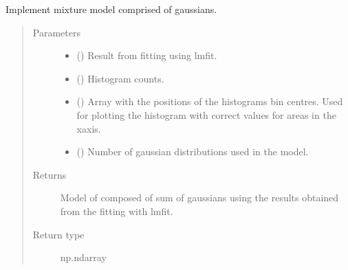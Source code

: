 \documentclass[letterpaper,10pt,english]{sphinxmanual}
\begin{document}
\begin{fulllineitems}
\label{\detokenize{tes:tes.calibration.gaussian_model}}
\sphinxAtStartPar
Implement mixture model comprised of gaussians.
\begin{quote}\begin{description}
\item[{Parameters}] \leavevmode\begin{itemize}
\item {} 
\sphinxAtStartPar
{} () \textendash{} Result from fitting using lmfit.

\item {} 
\sphinxAtStartPar
{} () \textendash{} Histogram counts.

\item {} 
\sphinxAtStartPar
{} () \textendash{} Array with the positions of the histograms bin centres.
Used for plotting the histogram with correct values
for areas in the x\sphinxhyphen{}axis.

\item {} 
\sphinxAtStartPar
{} () \textendash{} Number of gaussian distributions used in the model.

\end{itemize}

\item[{Returns}] \leavevmode
\sphinxAtStartPar
{} \textendash{} Model of composed of sum of gaussians using the results
obtained from the fitting with lmfit.

\item[{Return type}] \leavevmode
\sphinxAtStartPar
np.ndarray

\end{description}\end{quote}

\end{fulllineitems}
\end{document}
